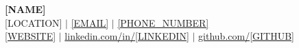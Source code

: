 \begin{flushleft}
	\textbf{\Huge [NAME]} \\
	\small
	 [LOCATION] $|$
	 \href{mailto:[EMAIL]}{[EMAIL]} $|$
	 \href{tel:[PHONE_NUMBER]}{[PHONE_NUMBER]} \\[4pt]
	 \href{https://[WEBSITE]}{[WEBSITE]} $|$
	 \href{https://linkedin.com/in/[LINKEDIN]}{linkedin.com/in/[LINKEDIN]} $|$
	 \href{https://github.com/[GITHUB]}{github.com/[GITHUB]}
\end{flushleft}